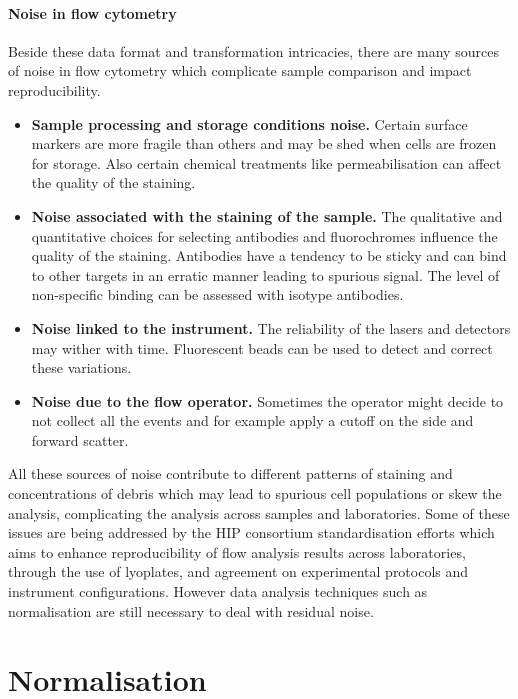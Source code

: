 \paragraph{Noise in flow cytometry} 
Beside these data format and transformation intricacies, there are many sources of noise in flow cytometry which complicate sample comparison and impact reproducibility.  
\begin{itemize}
  \item \textbf{Sample processing and storage conditions noise.}
    Certain surface markers are more fragile than others and may be shed when cells are frozen for storage.
    Also certain chemical treatments like permeabilisation can affect the quality of the staining.
  \item \textbf{Noise associated with the staining of the sample.}
    The qualitative and quantitative choices for selecting antibodies and fluorochromes influence the quality of the staining.
    Antibodies have a tendency to be sticky and can bind to other targets in an erratic manner leading to spurious signal.
    The level of non-specific binding can be assessed with isotype antibodies.  
  \item \textbf{Noise linked to the instrument.}
    The reliability of the lasers and detectors may wither with time.
    Fluorescent beads can be used to detect and correct these variations.  
  \item \textbf{Noise due to the flow operator.}
    Sometimes the operator might decide to not collect all the events and for example apply a cutoff on the side and forward scatter.
\end{itemize}
All these sources of noise contribute to different patterns of staining and concentrations of debris
which may lead to spurious cell populations or skew the analysis, complicating the analysis across samples and laboratories.
Some of these issues are being addressed by the \gls{HIP} consortium standardisation efforts \citep{Maecker:2012gl}
which aims to enhance reproducibility of flow analysis results across laboratories,
through the use of lyoplates, and agreement on experimental protocols and instrument configurations.
However data analysis techniques such as normalisation are still necessary to deal with residual noise.

\section{Normalisation}


